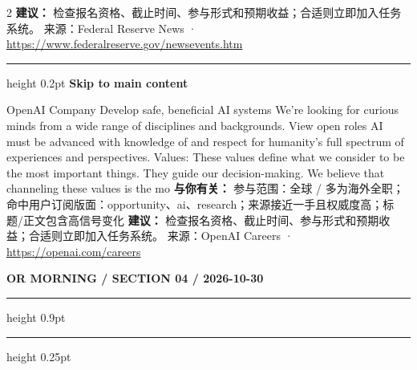 \documentclass[10.5pt]{ctexart}
\begin{document}
\begin{multicols}{2}
\textbf{建议：} 检查报名资格、截止时间、参与形式和预期收益；合适则立即加入任务系统。
{\footnotesize\color{ormuted} 来源：Federal Reserve News · \url{https://www.federalreserve.gov/newsevents.htm}}
\vspace{2mm}
\hrule height 0.2pt
\vspace{2mm}
{\large\bfseries Skip to main content}\par
OpenAI Company Develop safe, beneficial AI systems We’re looking for curious minds from a wide range of disciplines and backgrounds. View open roles AI must be advanced with knowledge of and respect for humanity’s full spectrum of experiences and perspectives. Values: These values define what we consider to be the most important things. They guide our decision-making. We believe that channeling these values is the mo
\textbf{与你有关：} 参与范围：全球 / 多为海外全职；命中用户订阅版面：opportunity、ai、research；来源接近一手且权威度高；标题/正文包含高信号变化
\textbf{建议：} 检查报名资格、截止时间、参与形式和预期收益；合适则立即加入任务系统。
{\footnotesize\color{ormuted} 来源：OpenAI Careers · \url{https://openai.com/careers}}
\end{multicols}
\newpage
{\small\bfseries OR MORNING / SECTION 04 / 2026-10-30}
\vspace{2mm}
\hrule height 0.9pt
\vspace{1.5mm}
\hrule height 0.25pt
\vspace{4mm}
\end{document}
